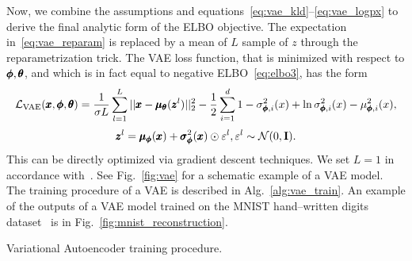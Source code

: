 Now, we combine the assumptions and equations~\eqref{eq:vae_kld}--\eqref{eq:vae_logpx} to derive the final analytic form of the ELBO objective. The expectation in~\eqref{eq:vae_reparam} is replaced by a mean of $L$ sample of $z$ through the reparametrization trick. The VAE loss function, that is minimized with respect to $\pmb{{\phi}}, \pmb{{\theta}}$, and which is in fact equal to negative ELBO~\eqref{eq:elbo3}, has the form
\begin{equation} \label{eq:vae_loss}
\mathcal{L_{\text{VAE}}}(\pmb{{x}},\pmb{{\phi}},\pmb{{\theta}})=\frac{1}{\sigma L}\sum_{l=1}^{L}||\pmb{{x}}-\pmb{{\mu}}_{\pmb{{\theta}}}(\pmb{{z}}^{l})||_{2}^{2} - \frac{1}{2}\sum_{i=1}^{d} 1-\sigma_{\pmb{{\phi}},i}^{2}(x)+\ln\sigma_{\pmb{{\phi}},i}^{2}(x)-\mu_{\pmb{{\phi}},i}^{2}(x),
\end{equation}
\begin{equation} 
\pmb{{z}}^l=\pmb{{\mu}}_{\pmb{{\phi}}}(\pmb{{x}})+\pmb{{\sigma}}^2_{\pmb{{\phi}}}(\pmb{{x}}) \odot \varepsilon^l, \varepsilon^l \sim  \mathcal{N}(0,\mathbf{I}). \nonumber
\end{equation}
This can be directly optimized via gradient descent techniques. We set $L=1$ in accordance with~\cite{kingma2013vae}. See Fig.~\ref{fig:vae} for a schematic example of a VAE model. The training procedure of a VAE is described in Alg.~\ref{alg:vae_train}. An example of the outputs of a VAE model trained on the MNIST hand--written digits dataset~\cite{lecun-mnisthandwrittendigit-2010} is in Fig.~\ref{fig:mnist_reconstruction}.

\begin{algorithm}
\caption{Variational Autoencoder training procedure.}
\label{alg:vae_train}
\end{algorithm}

